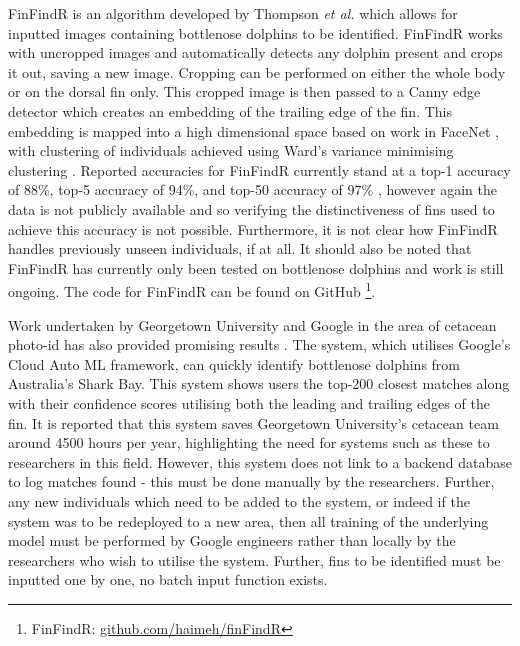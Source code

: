 FinFindR is an algorithm developed by Thompson \textit{et al.} which allows for inputted images containing bottlenose dolphins to be identified. FinFindR works with uncropped images and automatically detects any dolphin present and crops it out, saving a new image. Cropping can be performed on either the whole body or on the dorsal fin only. This cropped image is then passed to a Canny edge detector which creates an embedding of the trailing edge of the fin. This embedding is mapped into a high dimensional space based on work in FaceNet \cite{schroff_facenet_2015}, with clustering of individuals achieved using Ward's variance minimising clustering \cite{ward_hierarchical_1963}. Reported accuracies for FinFindR currently stand at a top-1 accuracy of 88\%, top-5 accuracy of 94\%, and top-50 accuracy of 97\% \cite{thompson_finfindrpdf_2019}, however again the data is not publicly available and so verifying the distinctiveness of fins used to achieve this accuracy is not possible. Furthermore, it is not clear how FinFindR handles previously unseen individuals, if at all. It should also be noted that FinFindR has currently only been tested on bottlenose dolphins and work is still ongoing. The code for FinFindR can be found on GitHub \footnote{\label{footnote:FinFindR}FinFindR: \href{https://github.com/haimeh/finFindR}{github.com/haimeh/finFindR}}. 

Work undertaken by Georgetown University and Google in the area of cetacean photo-id has also provided promising results \cite{mann_dolphin_2019, georgetown_university_is_2018, liang_googles_2018}. The system, which utilises Google's Cloud Auto ML framework, can quickly identify bottlenose dolphins from Australia's Shark Bay. This system shows users the top-200 closest matches along with their confidence scores utilising both the leading and trailing edges of the fin. It is reported that this system saves Georgetown University's cetacean team around 4500 hours per year, highlighting the need for systems such as these to researchers in this field. However, this system does not link to a backend database to log matches found - this must be done manually by the researchers. Further, any new individuals which need to be added to the system, or indeed if the system was to be redeployed to a new area, then all training of the underlying model must be performed by Google engineers rather than locally by the researchers who wish to utilise the system. Further, fins to be identified must be inputted one by one, no batch input function exists.  

